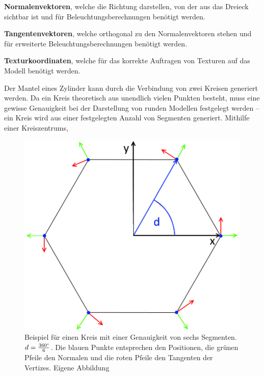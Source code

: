 \begin{description}
	\item \textbf{Normalenvektoren}, welche die Richtung darstellen, von der aus das Dreieck sichtbar ist und für Beleuchtungsberechnungen benötigt werden. \cite{ModelingByNumbers1A:13} 
	\item \textbf{Tangentenvektoren}, welche orthogonal zu den Normalenvektoren stehen und für erweiterte Beleuchtungsberechnungen benötigt werden.
	\item \textbf{Texturkoordinaten}, welche für das korrekte Auftragen von Texturen auf das Modell benötigt werden. \cite{ModelingByNumbers1A:13} 
\end{description}


Der Mantel eines Zylinder kann durch die Verbindung von zwei Kreisen generiert werden. Da ein Kreis theoretisch aus unendlich vielen Punkten besteht, muss eine gewisse Genauigkeit bei der Darstellung von runden Modellen festgelegt werden -- ein Kreis wird aus einer festgelegten Anzahl von Segmenten generiert. Mithilfe einer Kreiszentrums, 

\begin{figure} [hbtp]
	\centering
	\includegraphics[height=0.35\textheight]{images/Ring6Sections.png}
	\caption{Beispiel für einen Kreis mit einer Genauigkeit von sechs Segmenten. $d = \frac{360\degree}{6}$. Die blauen Punkte entsprechen den Positionen, die grünen Pfeile den Normalen und die roten Pfeile den Tangenten der Vertizes. Eigene Abbildung}
	\label{fig:Ring6Sections}
\end{figure}




